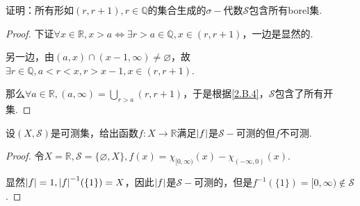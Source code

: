 \begin{problem}[5]\label{2.B.5}
    证明：所有形如\((r,r+1), r \in \mathbb{Q}\)的集合生成的\(\sigma-\)代数\(\mathcal{S}\)包含所有borel集.
\end{problem}

\begin{proof}
    下证\(\forall x \in \mathbb{R}, x>a \Longleftrightarrow \exists r>a \in \mathbb{Q}, x \in (r,r+1)\)，一边是显然的.

    另一边，由\((a,x) \cap (x-1, \infty) \ne \varnothing\)，故\(\exists r \in \mathbb{Q}, a<r<x, r>x-1, x \in (r,r+1)\).

    那么\(\forall a \in \mathbb{R}, (a,\infty)=\bigcup_{r>a}(r,r+1)\)，于是根据\cref{2.B.4}，\(\mathcal{S}\)包含了所有开集.
\end{proof}

\begin{comment}
    \begin{problem}[7]\label{2.B.7}
        证明：若\(B \subseteq \mathbb{R}\)是borel集，那么\(\forall t \in \mathbb{R}, t+B\)是borel集.
    \end{problem}

    \begin{proof}
        任意开集\(G\)可以表示成可数不相交开区间之并，即\(G=\bigcup_{k=1}^\infty I_k\).
        
        显然\(t+G=\bigcup_{k=1}^\infty (t+I_k)\)，因此{\kaishu 开集具有平移不变性}，从而\(\sigma(t+G)=\sigma(G)\)，证毕.
    \end{proof}
\end{comment}

\begin{problem}[9]\label{2.B.9}
    设\((X,\mathcal{S})\)是可测集，给出函数\(f: X \to \mathbb{R}\)满足\(\abs*{f}\)是\(\mathcal{S}-\)可测的但\(f\)不可测.
\end{problem}

\begin{proof}
    令\(X=\mathbb{R}, \mathcal{S}=\{\varnothing, X\}, f(x)=\chi_{[0,\infty)}(x)-\chi_{(-\infty,0)}(x)\).

    显然\(\abs*{f}=1, \abs*{f}^{-1}(\{1\})=X\)，因此\(\abs*{f}\)是\(\mathcal{S}-\)可测的，但是\(f^{-1}(\{1\})=[0,\infty) \notin \mathcal{S}\).
\end{proof}

